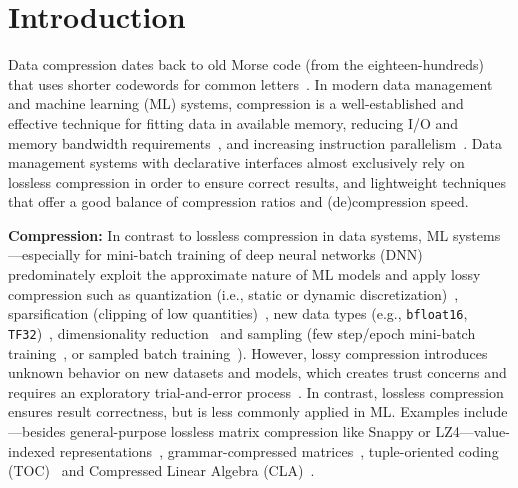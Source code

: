 
\section{Introduction}
\label{sec:Introduction}


Data compression dates back to old Morse code (from the eighteen-hundreds) that uses shorter codewords for common letters~\cite{Wolfram02}.
In modern data management and machine learning (ML) systems, compression is a well-established and effective technique for fitting data in available memory, reducing I/O and memory bandwidth requirements~\cite{RamanS06, ElgoharyBHRR16}, and increasing instruction parallelism~\cite{WillhalmPBPZS09}.
Data management systems with declarative interfaces almost exclusively rely on lossless compression in order to ensure correct results,
and lightweight techniques \cite{DammeUHHL19,DammeHHL17} that offer a good balance of compression ratios and (de)compression speed.

\textbf{Compression:} In contrast to lossless compression in data systems, ML systems---especially for mini-batch training of deep neural networks (DNN) predominately exploit the approximate nature of ML models and apply lossy compression such as quantization (i.e., static or dynamic discretization)~\cite{tfmopt2, Zhang0KALZ17}, sparsification (clipping of low quantities)~\cite{tfmopt1, A100}, new data types (e.g., \texttt{bfloat16}, \texttt{TF32})~\cite{Saeta18, KosterWWNBCEHHK17,A100}, dimensionality reduction~\cite{IlkhechiCGMFSC20} and sampling (few step/epoch mini-batch training~\cite{SuchRLSC20}, or sampled batch training~\cite{ParkQSM19}).
However, lossy compression introduces unknown behavior on new datasets and models, which creates trust concerns and requires an exploratory trial-and-error process~\cite{WangKZAZM19}.
In contrast, lossless compression ensures result correctness, but is less commonly applied in ML.
Examples include---besides general-purpose lossless matrix compression like Snappy or LZ4---value-indexed representations~\cite{KourtisGK08, KarakasisGKGK13}, grammar-compressed matrices~\cite{TabeiSYP16}, tuple-oriented coding (TOC)~\cite{LiCZ00NP19} and Compressed Linear Algebra (CLA)~\cite{ElgoharyBHRR16, ElgoharyBHRR18}.

